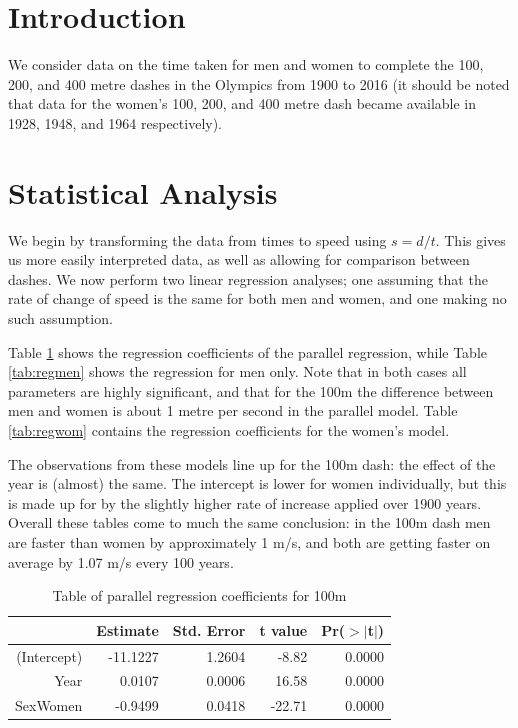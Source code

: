 \documentclass[11pt]{article}
\begin{document}
\section{Introduction}
We consider data on the time taken for men and women to complete the 100, 200, and 400 metre dashes in the Olympics from 1900 to 2016 (it should be noted that data for the women's 100, 200, and 400 metre dash became available in 1928, 1948, and 1964 respectively). 

\section{Statistical Analysis}
We begin by transforming the data from times to speed using $s = d/t$. This gives us more easily interpreted data, as well as allowing for comparison between dashes. We now perform two linear regression analyses; one assuming that the rate of change of speed is the same for both men and women, and one making no such assumption. 

Table \ref{tab:reg1} shows the regression coefficients of the parallel regression, while Table \ref{tab:regmen} shows the regression for men only. Note that in both cases all parameters are highly significant, and that for the 100m the difference between men and women is about 1 metre per second in the parallel model. Table \ref{tab:regwom} contains the regression coefficients for the women's model.

The observations from these models line up for the 100m dash: the effect of the year is (almost) the same. The intercept is lower for women individually, but this is made up for by the slightly higher rate of increase applied over 1900 years. Overall these tables come to much the same conclusion: in the 100m dash men are faster than women by approximately 1 m/s, and both are getting faster on average by 1.07 m/s every 100 years.

\begin{table}[ht]
\centering
\begin{tabular}{rrrrr}
  \hline
 & Estimate & Std. Error & t value & Pr($>$$|$t$|$) \\ 
  \hline
(Intercept) & -11.1227 & 1.2604 & -8.82 & 0.0000 \\ 
  Year & 0.0107 & 0.0006 & 16.58 & 0.0000 \\ 
  SexWomen & -0.9499 & 0.0418 & -22.71 & 0.0000 \\ 
   \hline
\end{tabular}
\caption{Table of parallel regression coefficients for 100m}
\label{tab:reg1}
\end{table}
\end{document}

